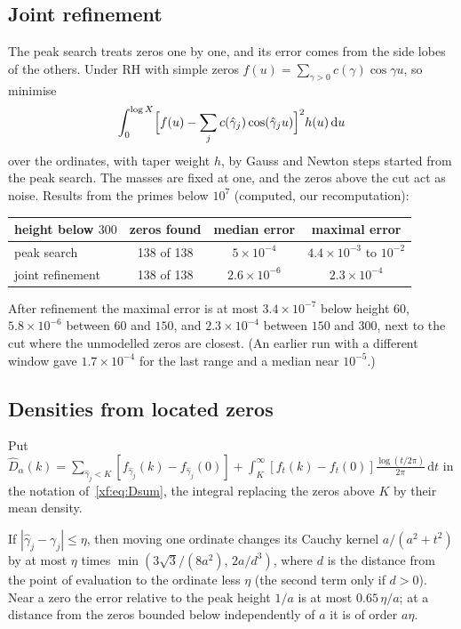 \subsection*{Joint refinement}
The peak search treats zeros one by one, and its error comes from the side lobes of the others. Under RH with simple zeros $f(u)=\sum_{\gamma>0}c(\gamma)\cos\gamma u$, so minimise
\[
\int_0^{\log X}\Bigl[f(u)-\sum_jc(\hat\gamma_j)\cos(\hat\gamma_ju)\Bigr]^2h(u)\,\mathrm du
\]
over the ordinates, with taper weight $h$, by Gauss and Newton steps started from the peak search. The masses are fixed at one, and the zeros above the cut act as noise. Results from the primes below $10^7$ (computed, our recomputation):
\begin{center}
\small
\begin{tabular}{lccc}
\toprule
height below $300$ & zeros found & median error & maximal error\\
\midrule
peak search & 138 of 138 & $5\times10^{-4}$ & $4.4\times10^{-3}$ to $10^{-2}$\\
joint refinement & 138 of 138 & $2.6\times10^{-6}$ & $2.3\times10^{-4}$\\
\bottomrule
\end{tabular}
\end{center}
After refinement the maximal error is at most $3.4\times10^{-7}$ below height $60$, $5.8\times10^{-6}$ between $60$ and $150$, and $2.3\times10^{-4}$ between $150$ and $300$, next to the cut where the unmodelled zeros are closest. (An earlier run with a different window gave $1.7\times10^{-4}$ for the last range and a median near $10^{-5}$.)

\subsection*{Densities from located zeros}
Put $\widehat D_\alpha(k)=\sum_{\hat\gamma_j<K}[f_{\hat\gamma_j}(k)-f_{\hat\gamma_j}(0)]+\int_K^\infty[f_t(k)-f_t(0)]\frac{\log(t/2\pi)}{2\pi}\,\mathrm dt$ in the notation of~\eqref{xf:eq:Dsum}, the integral replacing the zeros above $K$ by their mean density.

\begin{proposition}\label{xf:prop:prop}
If $|\hat\gamma_j-\gamma_j|\le\eta$, then moving one ordinate changes its Cauchy kernel $a/(a^2+t^2)$ by at most $\eta$ times $\min(3\sqrt3/(8a^2),\,2a/d^3)$, where $d$ is the distance from the point of evaluation to the ordinate less $\eta$ (the second term only if $d>0$). Near a zero the error relative to the peak height $1/a$ is at most $0.65\,\eta/a$; at a distance from the zeros bounded below independently of $a$ it is of order $a\eta$.
\end{proposition}

